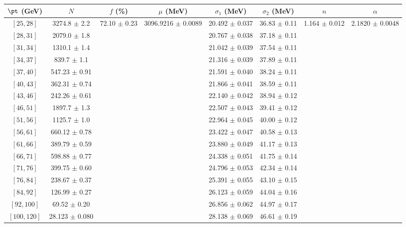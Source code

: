 \begin{tabular}{c||c|c|c|c|c|c|c}
$\pt$ (GeV) & $N$ & $f$ (\%) & $\mu$ (MeV) & $\sigma_1$ (MeV) & $\sigma_2$ (MeV) & $n$ & $\alpha$ \\
\hline
$[25, 28]$ & 3274.8 $\pm$ 2.2 & \multirow{17}{*}{72.10 $\pm$ 0.23} & \multirow{17}{*}{3096.9216 $\pm$ 0.0089} & 20.492 $\pm$ 0.037 & 36.83 $\pm$ 0.11 & \multirow{17}{*}{1.164 $\pm$ 0.012} & \multirow{17}{*}{2.1820 $\pm$ 0.0048}\\
$[28, 31]$ & 2079.0 $\pm$ 1.8 &  &  & 20.767 $\pm$ 0.038 & 37.18 $\pm$ 0.11 &  & \\
$[31, 34]$ & 1310.1 $\pm$ 1.4 &  &  & 21.042 $\pm$ 0.039 & 37.54 $\pm$ 0.11 &  & \\
$[34, 37]$ & 839.7 $\pm$ 1.1 &  &  & 21.316 $\pm$ 0.039 & 37.89 $\pm$ 0.11 &  & \\
$[37, 40]$ & 547.23 $\pm$ 0.91 &  &  & 21.591 $\pm$ 0.040 & 38.24 $\pm$ 0.11 &  & \\
$[40, 43]$ & 362.31 $\pm$ 0.74 &  &  & 21.866 $\pm$ 0.041 & 38.59 $\pm$ 0.11 &  & \\
$[43, 46]$ & 242.26 $\pm$ 0.61 &  &  & 22.140 $\pm$ 0.042 & 38.94 $\pm$ 0.12 &  & \\
$[46, 51]$ & 1897.7 $\pm$ 1.3 &  &  & 22.507 $\pm$ 0.043 & 39.41 $\pm$ 0.12 &  & \\
$[51, 56]$ & 1125.7 $\pm$ 1.0 &  &  & 22.964 $\pm$ 0.045 & 40.00 $\pm$ 0.12 &  & \\
$[56, 61]$ & 660.12 $\pm$ 0.78 &  &  & 23.422 $\pm$ 0.047 & 40.58 $\pm$ 0.13 &  & \\
$[61, 66]$ & 389.79 $\pm$ 0.59 &  &  & 23.880 $\pm$ 0.049 & 41.17 $\pm$ 0.13 &  & \\
$[66, 71]$ & 598.88 $\pm$ 0.77 &  &  & 24.338 $\pm$ 0.051 & 41.75 $\pm$ 0.14 &  & \\
$[71, 76]$ & 399.75 $\pm$ 0.60 &  &  & 24.796 $\pm$ 0.053 & 42.34 $\pm$ 0.14 &  & \\
$[76, 84]$ & 238.67 $\pm$ 0.37 &  &  & 25.391 $\pm$ 0.055 & 43.10 $\pm$ 0.15 &  & \\
$[84, 92]$ & 126.99 $\pm$ 0.27 &  &  & 26.123 $\pm$ 0.059 & 44.04 $\pm$ 0.16 &  & \\
$[92, 100]$ & 69.52 $\pm$ 0.20 &  &  & 26.856 $\pm$ 0.062 & 44.97 $\pm$ 0.17 &  & \\
$[100, 120]$ & 28.123 $\pm$ 0.080 &  &  & 28.138 $\pm$ 0.069 & 46.61 $\pm$ 0.19 &  & \\
\end{tabular}
